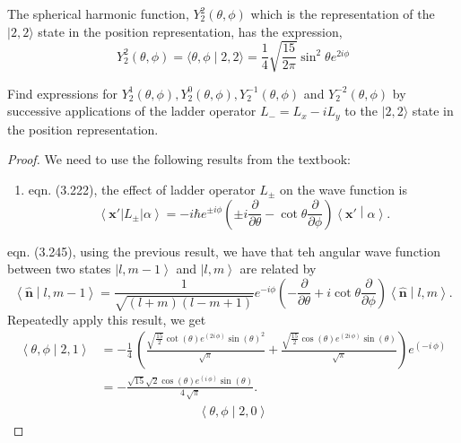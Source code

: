 \begin{problem}
	The spherical harmonic function, $Y_2^2(\theta, \phi)$ which is the representation of the $|2,2\rangle$ state in the position representation, has the expression,
\[
Y_2^2(\theta, \phi)=\langle\theta, \phi \mid 2,2\rangle=\frac{1}{4} \sqrt{\frac{15}{2 \pi}} \sin ^2 \theta e^{2 i \phi}
\]

Find expressions for $Y_2^1(\theta, \phi), Y_2^0(\theta, \phi), Y_2^{-1}(\theta, \phi)$ and $Y_2^{-2}(\theta, \phi)$ by successive applications of the ladder operator $L_{-}=L_x-i L_y$ to the $|2,2\rangle$ state in the position representation.
\end{problem}
\begin{proof}
	We need to use the following results from the textbook:
	\begin{enumerate}
		\item eqn. (3.222), the effect of ladder operator $L_{\pm}$ on the wave function is
			\[
				\left\langle \mathbf{x}' \right| L_{\pm} \left| \alpha \right\rangle 
				= - i \hbar e^{ \pm i \phi} \left(  \pm  i \frac{\partial }{\partial \theta} - \cot \theta \frac{\partial }{\partial \phi}  \right) 
				\left\langle \mathbf{x}' \middle| \alpha \right\rangle 
			.\] 
	\end{enumerate}
\item eqn. (3.245), using the previous result, we have that teh angular wave function between two states $\left| l, m - 1 \right\rangle $ and $\left| l, m \right\rangle $ are related by
	\[
		\left\langle \hat{\mathbf{n}}  \middle| l, m - 1\right\rangle
		= \frac{1}{\sqrt{(l + m) (l - m + 1)} } e^{- i \phi} \left( - \frac{\partial }{\partial \theta} + i \cot \theta \frac{\partial }{\partial \phi}  \right) \left\langle \hat{\mathbf{n}}  \middle| l,m \right\rangle 
	.\] 
	Repeatedly apply this result, we get
	\begin{align*}
		\left\langle \theta, \phi \middle| 2,1 \right\rangle 
		&= -\frac{1}{4} \, {\left(\frac{\sqrt{\frac{15}{2}} \cot\left({\theta}\right) e^{\left(2 i \, {\phi}\right)} \sin\left({\theta}\right)^{2}}{\sqrt{\pi}} + \frac{\sqrt{\frac{15}{2}} \cos\left({\theta}\right) e^{\left(2 i \, {\phi}\right)} \sin\left({\theta}\right)}{\sqrt{\pi}}\right)} e^{\left(-i \, {\phi}\right)}\\
		&= -\frac{\sqrt{15} \sqrt{2} \cos\left({\theta}\right) e^{\left(i \, {\phi}\right)} \sin\left({\theta}\right)}{4 \, \sqrt{\pi}}
	.\end{align*}
	\begin{align*}
		\left\langle \theta, \phi \middle| 2,0 \right\rangle 

\end{align*}
\end{proof}
